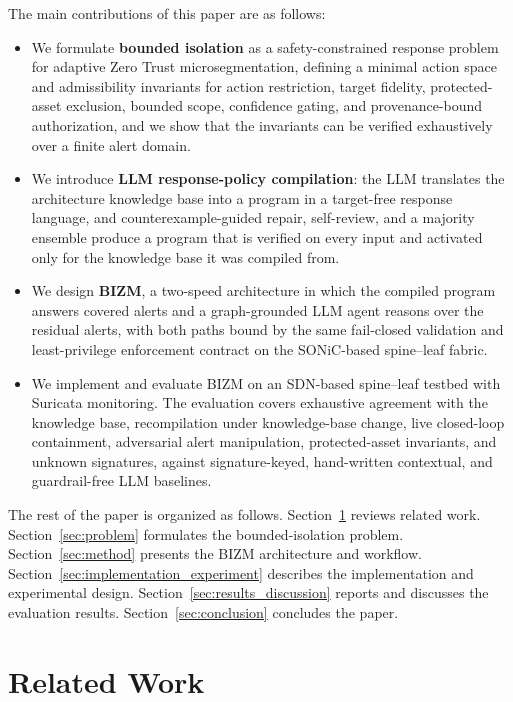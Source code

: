 \documentclass[final,5p]{elsarticle}
\begin{document}
The main contributions of this paper are as follows:
\begin{itemize}
    \item We formulate \textbf{bounded isolation} as a safety-constrained response problem for adaptive Zero Trust microsegmentation, defining a minimal action space and admissibility invariants for action restriction, target fidelity, protected-asset exclusion, bounded scope, confidence gating, and provenance-bound authorization, and we show that the invariants can be verified exhaustively over a finite alert domain.
    \item We introduce \textbf{LLM response-policy compilation}: the LLM translates the architecture knowledge base into a program in a target-free response language, and counterexample-guided repair, self-review, and a majority ensemble produce a program that is verified on every input and activated only for the knowledge base it was compiled from.
    \item We design \textbf{BIZM}, a two-speed architecture in which the compiled program answers covered alerts and a graph-grounded LLM agent reasons over the residual alerts, with both paths bound by the same fail-closed validation and least-privilege enforcement contract on the SONiC-based spine--leaf fabric.
    \item We implement and evaluate BIZM on an SDN-based spine--leaf testbed with Suricata monitoring. The evaluation covers exhaustive agreement with the knowledge base, recompilation under knowledge-base change, live closed-loop containment, adversarial alert manipulation, protected-asset invariants, and unknown signatures, against signature-keyed, hand-written contextual, and guardrail-free LLM baselines.
\end{itemize}

The rest of the paper is organized as follows. Section~\ref{sec:related} reviews related work. Section~\ref{sec:problem} formulates the bounded-isolation problem. Section~\ref{sec:method} presents the BIZM architecture and workflow. Section~\ref{sec:implementation_experiment} describes the implementation and experimental design. Section~\ref{sec:results_discussion} reports and discusses the evaluation results. Section~\ref{sec:conclusion} concludes the paper.

\section{Related Work}
\label{sec:related}
\end{document}
